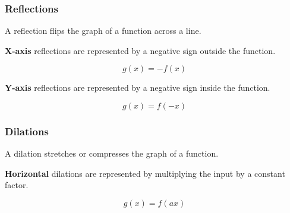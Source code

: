 \documentclass{article}
\begin{document}
\subsubsection{Reflections}

A reflection flips the graph of a function across a line. 

\textbf{X-axis} reflections are represented by a negative sign outside the function.

\begin{equation*}
    g(x) = -f(x)
\end{equation*}

\begin{center}
\end{center}

\textbf{Y-axis} reflections are represented by a negative sign inside the function.

\begin{equation*}
    g(x) = f(-x)
\end{equation*}

\begin{center}
\end{center}

\subsubsection{Dilations}

A dilation stretches or compresses the graph of a function.

\textbf{Horizontal} dilations are represented by multiplying the input by a constant factor. 

\begin{equation*}
    g(x) = f(ax)
\end{equation*}
\end{document}
